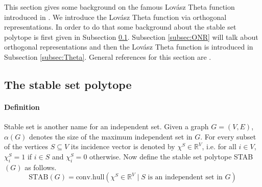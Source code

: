 This section gives some background on the famous Lov\'{a}sz Theta function introduced in \cite{Shannon}. %
We introduce the Lov\'{a}sz Theta function via orthogonal representations. In order to do that some background about the stable set polytope is first given in Subsection \ref{subsec:STAB}. Subsection \ref{subsec:ONR} will talk about orthogonal representations and then the Lov\'{a}sz Theta function is introduced in Subsection \ref{subsec:Theta}. General references for this section are \cite{SDP11,GLS,Lovasz1,SDP10}.

\subsection{The stable set polytope}\label{subsec:STAB}


\paragraph{Definition} Stable set is another name for an independent set. Given a graph $G = (V,E)$, $\alpha(G)$ denotes the size of the maximum independent set in $G$. For every subset of the vertices $S \subseteq V$ its incidence vector is denoted by $\chi^S \in \mathbb{R}^V$, i.e. for all $i \in V$, $\chi^S_i = 1$ if $i \in S$ and $\chi^S_i = 0$ otherwise. Now define the stable set polytope STAB$(G)$ as follows.
%
\begin{equation*}
\textrm{STAB}(G) = \textrm{conv.hull}( \chi^S \in \mathbb{R}^V \mid S \textrm{ is an independent set in } G )
\end{equation*}
%
